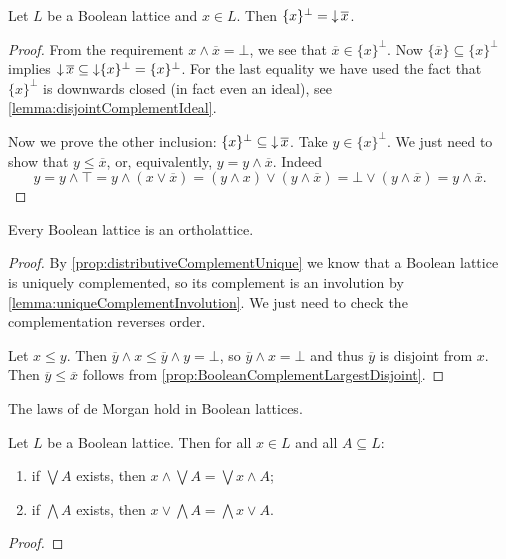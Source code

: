\begin{lemma} \label{prop:BooleanComplementLargestDisjoint}
Let $L$ be a Boolean lattice and $x\in L$. Then $\{x\}^\perp = \mathop{\downarrow} \overline{x}$.
\end{lemma}
\begin{proof}
From the requirement $x\wedge \overline{x} = \bot$, we see that $\overline{x}\in \{x\}^\perp$. Now $\{\overline{x}\} \subseteq \{x\}^\perp$ implies $\mathop{\downarrow} \overline{x} \subseteq \mathop{\downarrow}\{x\}^\perp = \{x\}^\perp$. For the last equality we have used the fact that $\{x\}^\perp$ is downwards closed (in fact even an ideal), see \ref{lemma:disjointComplementIdeal}.

Now we prove the other inclusion: $\{x\}^\perp \subseteq \mathop{\downarrow} \overline{x}$.
Take $y\in \{x\}^\perp$. We just need to show that $y\leq \overline{x}$, or, equivalently, $y = y\wedge \overline{x}$. Indeed
\[ y = y \wedge \top = y\wedge (x\vee \overline{x}) = (y\wedge x)\vee (y\wedge \overline{x}) = \bot \vee (y\wedge \overline{x}) = y\wedge \overline{x}. \]
\end{proof}
\begin{corollary}
Every Boolean lattice is an ortholattice.
\end{corollary}
\begin{proof}
By \ref{prop:distributiveComplementUnique} we know that a Boolean lattice is uniquely complemented, so its complement is an involution by \ref{lemma:uniqueComplementInvolution}. We just need to check the complementation reverses order.

Let $x\leq y$. Then $\overline{y} \wedge x \leq \overline{y} \wedge y = \bot$, so $\overline{y} \wedge x = \bot$ and thus $\overline{y}$ is disjoint from $x$. Then $\overline{y} \leq \overline{x}$ follows from \ref{prop:BooleanComplementLargestDisjoint}.
\end{proof}
\begin{corollary}
The laws of de Morgan hold in Boolean lattices.
\end{corollary}

\begin{proposition}
Let $L$ be a Boolean lattice. Then for all $x\in L$ and all $A\subseteq L$:
\begin{enumerate}
\item if $\bigvee A$ exists, then $x\wedge \bigvee A = \bigvee x\wedge A$;
\item if $\bigwedge A$ exists, then $x\vee \bigwedge A = \bigwedge x\vee A$.
\end{enumerate}
\end{proposition}
\begin{proof}

\end{proof}

